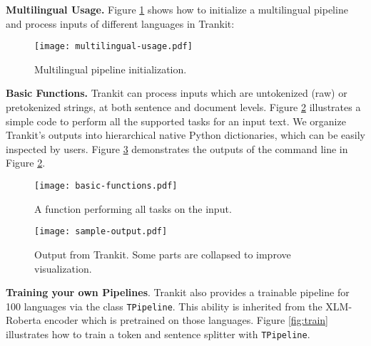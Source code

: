 \documentclass[11pt,a4paper]{article}
\begin{document}
\vspace{0.3cm}

\noindent \textbf{Multilingual Usage.} Figure \ref{fig:multilingual} shows how to initialize a multilingual pipeline and process inputs of different languages in Trankit:
\begin{figure}[ht]
    \centering
    \texttt{[image: multilingual-usage.pdf]}
    \caption{Multilingual pipeline initialization.}
    \label{fig:multilingual}
\end{figure}





\vspace{0.3cm}

\noindent \textbf{Basic Functions.} Trankit can process inputs which are untokenized (raw) or pretokenized strings, at both sentence and document levels. Figure \ref{fig:basic} illustrates a simple code to perform all the supported tasks for an input text. We organize Trankit's outputs into hierarchical native Python dictionaries, which can be easily inspected by users. Figure \ref{fig:output} demonstrates the outputs of the command line  in Figure \ref{fig:basic}.



\begin{figure}[ht]
    \centering
    \texttt{[image: basic-functions.pdf]}
    \caption{A function performing all tasks on the input.}
    \label{fig:basic}
\end{figure}

\begin{figure}[ht]
    \centering
    \texttt{[image: sample-output.pdf]}
    \caption{Output from Trankit. Some parts are collapsed to improve visualization.}
    \label{fig:output}
\end{figure}











\vspace{0.3cm}

\noindent \textbf{Training your own Pipelines}. Trankit also provides a trainable pipeline for 100 languages via the class \texttt{TPipeline}. This ability is inherited from the XLM-Roberta encoder which is pretrained on those languages. Figure \ref{fig:train} illustrates how to train a token and sentence splitter with \texttt{TPipeline}.
\end{document}
